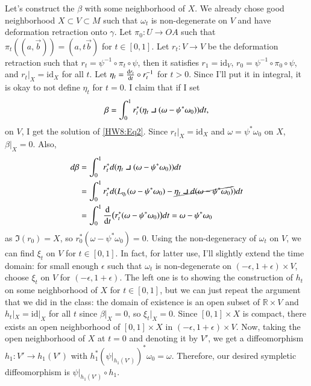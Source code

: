 \documentclass[a4paper, 12pt]{article}
\theoremstyle{Mydefinition}
\theoremstyle{Mytheorem}
\newcommand{\intprodl}{%
    \mathbin{\scalebox{1.5}{$\lrcorner$}}%
}
\begin{document}
\begin{enumerate}
    Let's construct the $\beta$ with some neighborhood of $X$. We already chose good neighborhood $X\subset V\subset M$ such that $\omega_t$ is non-degenerate on $V$ and have deformation retraction onto $\gamma$. Let $\pi_0:U\rightarrow OA$ such that $\pi_t((a, \vec{b})) = (a,t\vec{b})$ for $t\in [0,1]$. Let $r_t:V\rightarrow V$ be the deformation retraction such that $r_t = \psi^{-1}\circ \pi_t\circ \psi$, then it satisfies $r_1=\mathrm{id}_{V}$, $r_0 = \psi^{-1}\circ \pi_0\circ \psi$, and $r_t|_{X} = \mathrm{id}_X$ for all $t$. Let $\eta_t =\dv{r_t}{t}\circ r_t^{-1}$ for $t>0$. Since I'll put it in integral, it is okay to not define $\eta_t$ for $t=0$. I claim that if I set
    \begin{equation*}
        \beta = \int_0^1 r_t^*(\eta_t\intprodl (\omega-\psi^*\omega_0))dt,
    \end{equation*}
    on $V$, I get the solution of \eqref{HW8:Eq2}. Since $r_t|_{X} = \mathrm{id}_X$ and $\omega = \psi^*\omega_0$ on $X$, $\beta|_{X} = 0$. Also,
    \begin{equation*}
    \begin{split}
        d\beta &= \int_0^1 r_t^*d(\eta_t\intprodl (\omega-\psi^*\omega_0))dt\\
        &=\int_0^1 r_t^*d(L_{\eta_t}(\omega-\psi^*\omega_0) - \cancel{\eta_t\intprodl d(\omega-\psi^*\omega_0)})dt\\
        &=\int_0^1 \dv{t}(r_t^*(\omega-\psi^*\omega_0))dt = \omega-\psi^*\omega_0
    \end{split}
    \end{equation*}
    as $\Im(r_0)=X$, so $r_0^*(\omega-\psi^*\omega_0) = 0$. Using the non-degeneracy of $\omega_t$ on $V$, we can find $\xi_t$ on $V$ for $t\in [0,1]$. In fact, for latter use, I'll slightly extend the time domain: for small enough $\epsilon$ such that $\omega_t$ is non-degenerate on $(-\epsilon, 1+\epsilon)\times V$, choose $\xi_t$ on $V$ for $(-\epsilon, 1+\epsilon)$. The left one is to showing the construction of $h_t$ on some neighborhood of $X$ for $t\in [0,1]$, but we can just repeat the argument that we did in the class: the domain of existence is an open subset of $\mathbb{R}\times V$ and $h_t|_X = \mathrm{id}|_X$ for all $t$ since $\beta|_X = 0$, so $\xi_t|_X = 0$. Since $[0,1]\times X$ is compact, there exists an open neighborhood of $[0,1]\times X$ in $(-\epsilon, 1+\epsilon)\times V$. Now, taking the open neighborhood of $X$ at $t=0$ and denoting it by $V'$, we get a diffeomorphism $h_1:V'\rightarrow h_1(V')$ with $h_1^*(\psi|_{h_1(V')})^*\omega_0 = \omega$. Therefore, our desired sympletic diffeomorphism is $\psi|_{h_1(V')}\circ h_1$.
    

\end{enumerate}
\end{document}
